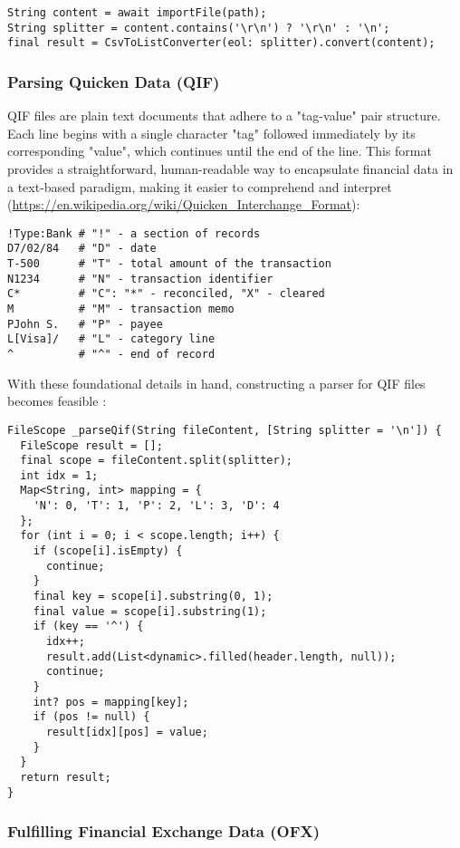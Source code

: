 \begin{lstlisting}
String content = await importFile(path);
String splitter = content.contains('\r\n') ? '\r\n' : '\n';
final result = CsvToListConverter(eol: splitter).convert(content);
\end{lstlisting}


\subsubsection{Parsing Quicken Data (QIF)}

QIF files are plain text documents that adhere to a "tag-value" pair structure. Each line begins with a single character 
"tag" followed immediately by its corresponding "value", which continues until the end of the line. This format provides 
a straightforward, human-readable way to encapsulate financial data in a text-based paradigm, making it easier to 
comprehend and interpret (\href{https://en.wikipedia.org/wiki/Quicken_Interchange_Format}{https://en.wikipedia.org/wiki/Quicken\_Interchange\_Format}):

\begin{lstlisting}[language=terminal]
!Type:Bank # "!" - a section of records
D7/02/84   # "D" - date
T-500      # "T" - total amount of the transaction
N1234      # "N" - transaction identifier
C*         # "C": "*" - reconciled, "X" - cleared
M          # "M" - transaction memo
PJohn S.   # "P" - payee
L[Visa]/   # "L" - category line
^          # "^" - end of record
\end{lstlisting}

\noindent With these foundational details in hand, constructing a parser for QIF files becomes feasible 
:

\begin{lstlisting}
FileScope _parseQif(String fileContent, [String splitter = '\n']) {
  FileScope result = [];
  final scope = fileContent.split(splitter);
  int idx = 1;
  Map<String, int> mapping = {
    'N': 0, 'T': 1, 'P': 2, 'L': 3, 'D': 4
  };
  for (int i = 0; i < scope.length; i++) {
    if (scope[i].isEmpty) {
      continue;
    }
    final key = scope[i].substring(0, 1);
    final value = scope[i].substring(1);
    if (key == '^') {
      idx++;
      result.add(List<dynamic>.filled(header.length, null));
      continue;
    }
    int? pos = mapping[key];
    if (pos != null) {
      result[idx][pos] = value;
    }
  }
  return result;
}
\end{lstlisting}


\subsubsection{Fulfilling Financial Exchange Data (OFX)}

